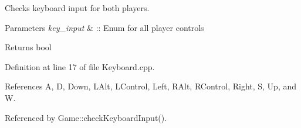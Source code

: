 Checks keyboard input for both players. 


\begin{DoxyParams}{Parameters}
{\em key\-\_\-input} & \-:\-: Enum for all player controls \\
\hline
\end{DoxyParams}
\begin{DoxyReturn}{Returns}
bool 
\end{DoxyReturn}


Definition at line 17 of file Keyboard.\-cpp.



References A, D, Down, L\-Alt, L\-Control, Left, R\-Alt, R\-Control, Right, S, Up, and W.



Referenced by Game\-::check\-Keyboard\-Input().



